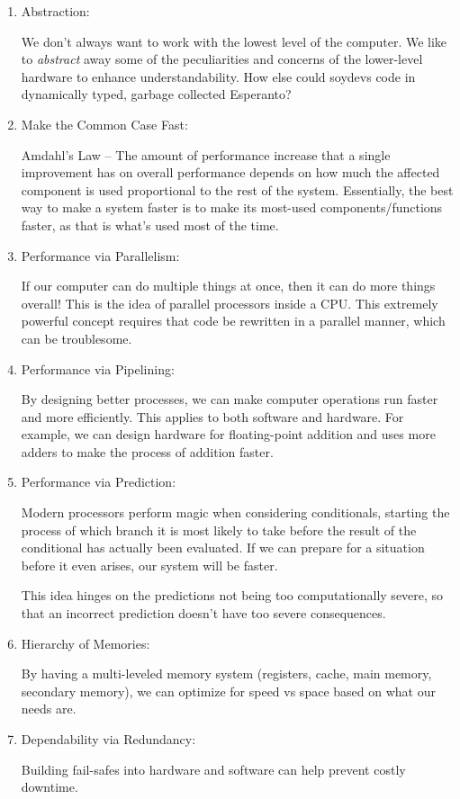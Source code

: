 \documentclass{article}
\begin{document}
\begin{enumerate}
    \item Abstraction: 

        We don't always want to work with the lowest level of the computer. We like to \emph{abstract} away some of the peculiarities and concerns of the lower-level hardware to enhance understandability. 
        How else could soydevs code in dynamically typed, garbage collected Esperanto?

    \item Make the Common Case Fast:

        Amdahl's Law -- The amount of performance increase that a single improvement has on overall performance depends on how much the affected component is used proportional to the rest of the system. Essentially, the best way to make a system faster is to make its most-used components/functions faster, as that is what's used most of the time. 

    \item
        Performance via Parallelism:

        If our computer can do multiple things at once, then it can do more things overall! This is the idea of parallel processors inside a CPU. This extremely powerful concept requires that code be rewritten in a parallel manner, which can be troublesome. 

    \item
        Performance via Pipelining:

        By designing better processes, we can make computer operations run faster and more efficiently. This applies to both software and hardware. For example, we can design hardware for floating-point addition and uses more adders to make the process of addition faster. 

    \item
        Performance via Prediction:

        Modern processors perform magic when considering conditionals, starting the process of which branch it is most likely to take before the result of the conditional has actually been evaluated. If we can prepare for a situation before it even arises, our system will be faster. 

        This idea hinges on the predictions not being too computationally severe, so that an incorrect prediction doesn't have too severe consequences. 

    \item
        Hierarchy of Memories:

        By having a multi-leveled memory system (registers, cache, main memory, secondary memory), we can optimize for speed vs space based on what our needs are. 

    \item
        Dependability via Redundancy:

        Building fail-safes into hardware and software can help prevent costly downtime. 
\end{enumerate}
\end{document}
